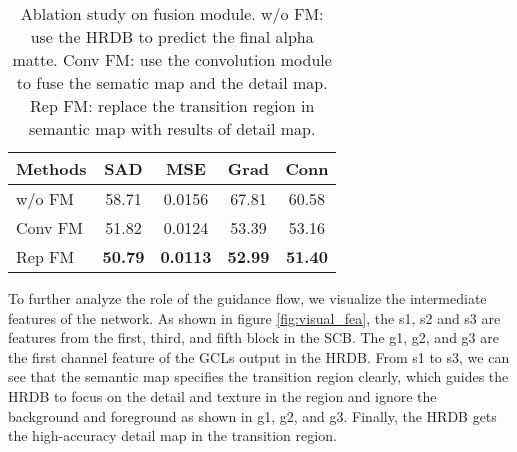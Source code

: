 \documentclass[10pt,twocolumn,letterpaper]{article}
\begin{document}
\begin{table}
  \centering
  \begin{tabular}{@{}lcccc@{}}
    \toprule
    Methods & SAD & MSE & Grad & Conn \\
    \midrule
    w/o FM & 58.71	& 0.0156 & 67.81 & 60.58 \\
    Conv FM & 51.82 & 0.0124 & 53.39 & 53.16 \\
    Rep FM &\bf{50.79} & \bf{0.0113} & \bf{52.99} & \bf{51.40} \\
    \bottomrule
  \end{tabular}
  \caption{Ablation study on fusion module. w/o FM: use the HRDB to predict the final alpha matte. Conv FM: use the convolution module to fuse the sematic map and the detail map. Rep FM: replace the transition region in semantic map with results of detail map.}
  \label{tab:fusion-ablation}
\end{table}



To further analyze the role of the guidance flow, we visualize the intermediate features of the network. As shown in figure \ref{fig:visual_fea}, the s1, s2 and s3 are features from the first, third, and fifth block in the SCB. The g1, g2, and g3 are the first channel feature of the GCLs output in the HRDB. From s1 to s3, we can see that the semantic map specifies the transition region clearly, which guides the HRDB to focus on the detail and texture in the region and ignore the background and foreground as shown in g1, g2, and g3. Finally, the HRDB gets the high-accuracy detail map in the transition region.
\end{document}

